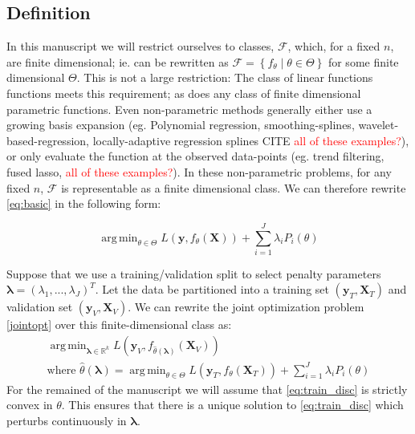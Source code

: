 \documentclass[10pt,letterpaper]{article}
\DeclareMathOperator*{\argmin}{arg\,min}
\begin{document}
\subsection{Definition}
In this manuscript we will restrict ourselves to classes, $\mathcal{F}$, which, for a fixed $n$, are finite dimensional; ie. can be rewritten as $\mathcal{F} = \left\{f_{\theta}\middle|\theta\in\Theta\right\}$ for some finite dimensional $\Theta$. This is not a large restriction: The class of linear functions functions meets this requirement; as does any class of finite dimensional parametric functions. Even non-parametric methods generally either use a growing basis expansion (eg. Polynomial regression, smoothing-splines, wavelet-based-regression, locally-adaptive regression splines CITE \textcolor{red}{all of these examples?}), or only evaluate the function at the observed data-points (eg. trend filtering, fused lasso, \textcolor{red}{all of these examples?}). In these non-parametric problems, for any fixed $n$, $\mathcal{F}$ is representable as a finite dimensional class.
We can therefore rewrite \eqref{eq:basic} in the following form:

\begin{equation}\label{eq:train_disc}
\argmin_{\theta \in \Theta} L(\boldsymbol{y}, f_\theta(\boldsymbol{X})) + \sum\limits_{i=1}^J \lambda_i P_i(\theta)
\end{equation}

Suppose that we use a training/validation split to select penalty parameters $\boldsymbol{\lambda} = (\lambda_1, ..., \lambda_J)^T$. Let the data be partitioned into a training set $(\boldsymbol{y}_T , \boldsymbol{X}_T)$ and validation set $(\boldsymbol{y}_V, \boldsymbol{X}_V)$. We can rewrite the joint optimization problem \eqref{jointopt} over this finite-dimensional class as:
\begin{equation}
\begin{array}{c}
\argmin_{\boldsymbol{\lambda} \in \mathbb{R}^k} L(\boldsymbol{y}_V, f_{\hat{\theta}(\boldsymbol{\lambda})}(\boldsymbol{X}_V)) \\
\text{where } {\hat{\theta}(\boldsymbol{\lambda})} = \argmin_{\theta \in \Theta} L(\boldsymbol{y}_T, f_\theta (\boldsymbol{X}_T)) + \sum\limits_{i=1}^J \lambda_i P_i(\theta)
\end{array}
\label{jointopt2}
\end{equation}
For the remained of the manuscript we will assume that \eqref{eq:train_disc} is strictly convex in $\theta$. This ensures that there is a unique solution to \eqref{eq:train_disc} which perturbs continuously in $\boldsymbol{\lambda}$.
\end{document}
